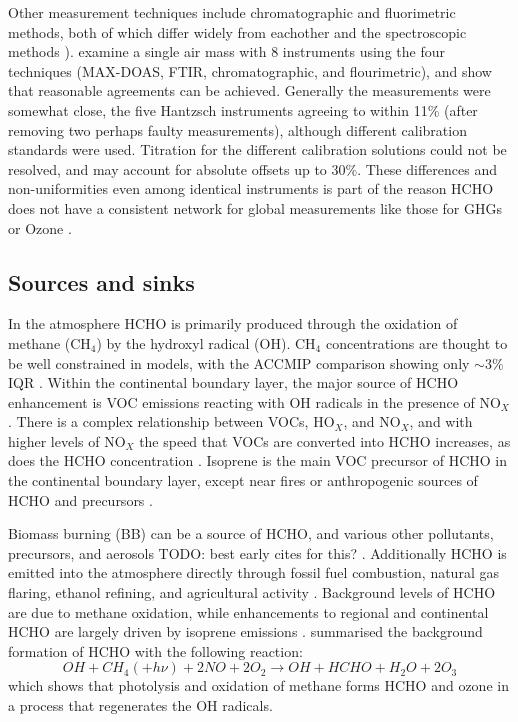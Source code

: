     Other measurement techniques include chromatographic and fluorimetric methods, both of which differ widely from eachother and the spectroscopic methods \citep{Hak2005}).
    \cite{Hak2005} examine a single air mass with 8 instruments using the four techniques (MAX-DOAS, FTIR, chromatographic, and flourimetric), and show that reasonable agreements can be achieved.
    Generally the measurements were somewhat close, the five Hantzsch instruments agreeing to within 11\% (after removing two perhaps faulty measurements), although different calibration standards were used.
    Titration for the different calibration solutions could not be resolved, and may account for absolute offsets up to 30\%.
    These differences and non-uniformities even among identical instruments is part of the reason HCHO does not have a consistent network for global measurements like those for GHGs or Ozone \citep{FortemsCheiney2012}.
  
  \subsection{Sources and sinks}
    
    In the atmosphere HCHO is primarily produced through the oxidation of methane (CH$_4$) by the hydroxyl radical (OH).
    CH$_4$ concentrations are thought to be well constrained in models, with the ACCMIP comparison showing only $\sim3$\% IQR \citep{Young2013}.
    Within the continental boundary layer, the major source of HCHO enhancement is VOC emissions reacting with OH radicals in the presence of NO$_X$ \citep{Wagner2002, Millet2006, Kefauver2014}.
    There is a complex relationship between VOCs, HO$_X$, and NO$_X$, and with higher levels of NO$_X$ the speed that VOCs are converted into HCHO increases, as does the HCHO concentration \citep{Wolfe2016}.
    Isoprene is the main VOC precursor of HCHO in the continental boundary layer, except near fires or anthropogenic sources of HCHO and precursors \citep{Guenther1995, Kefauver2014, Wolfe2016}.
    
    Biomass burning (BB) can be a source of HCHO, and various other pollutants, precursors, and aerosols TODO: best early cites for this? \citep{Guenther1995}.
    Additionally HCHO is emitted into the atmosphere directly through fossil fuel combustion, natural gas flaring, ethanol refining, and agricultural activity \citep{Wolfe2016}.
    Background levels of HCHO are due to methane oxidation, while enhancements to regional and continental HCHO are largely driven by isoprene emissions \citep{Guenther1995, Palmer2003, Shim2005, Kefauver2014}.
    \citet{Atkinson2000} summarised the background formation of HCHO with the following reaction:
    \begin{equation} \label{ch_LitRev:eqn:MethaneBackground}
    OH + CH_4 (+ h\nu) + 2NO + 2O_2 \rightarrow OH + HCHO + H_2O + 2O_3
    \end{equation}
    which shows that photolysis and oxidation of methane forms HCHO and ozone in a process that regenerates the OH radicals.
    
